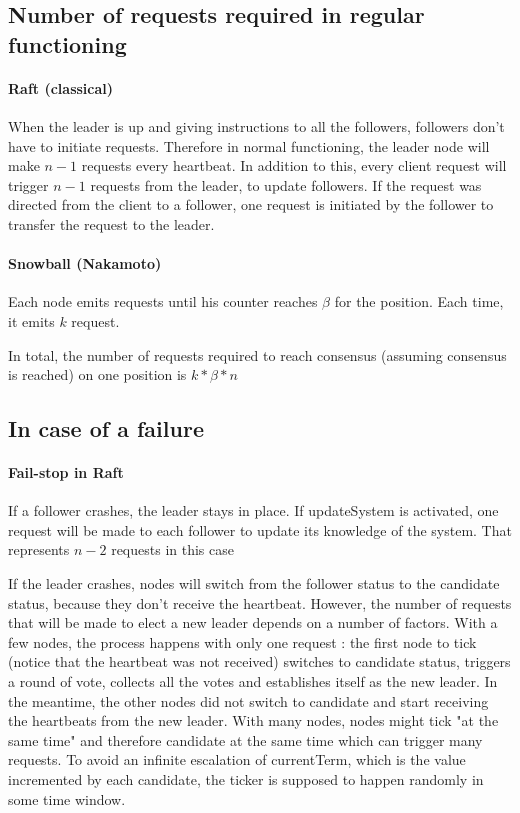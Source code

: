 \documentclass[11pt, twocolumn]{article}
\begin{document}
\subsection{Number of requests required in regular functioning}

\paragraph{Raft (classical)}
When the leader is up and giving instructions to all the followers, followers don't have to initiate requests.
Therefore in normal functioning, the leader node will make $n-1$ requests every heartbeat.
In addition to this, every client request will trigger $n-1$ requests from the leader, to update followers. If the request was directed from the client to a follower, one request is initiated
by the follower to transfer the request to the leader.

\paragraph{Snowball (Nakamoto)}
Each node emits requests until his counter reaches $\beta$ for the position. Each time, it emits $k$ request.

In total, the number of requests required to reach consensus (assuming consensus is reached) on one position is $k*\beta*n$
\subsection{In case of a failure}
\paragraph{Fail-stop in Raft}
If a follower crashes, the leader stays in place. If updateSystem is activated, one request will be made to each follower to update its knowledge of the system. That represents $n-2$ requests in this case

If the leader crashes, nodes will switch from the follower status to the candidate status, because they don't receive the heartbeat.
However, the number of requests that will be made to elect a new leader depends on a number of factors.
With a few nodes, the process happens with only one request : the first node to tick (notice that the heartbeat was not received) switches to candidate status, triggers a round of vote, collects all the votes and establishes itself as the new leader.
In the meantime, the other nodes did not switch to candidate and start receiving the heartbeats from the new leader.
With many nodes, nodes might tick "at the same time" and therefore candidate at the same time which can trigger many requests. To avoid an infinite escalation of currentTerm, which is the value incremented by each candidate, the ticker is supposed to happen randomly in some time window.
\end{document}
